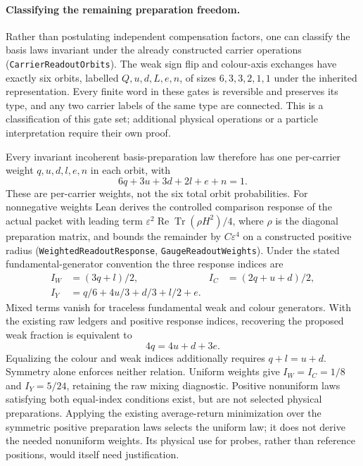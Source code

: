 \paragraph{Classifying the remaining preparation freedom.} Rather than postulating independent compensation factors, one can classify the basis laws invariant under the already constructed carrier operations (\texttt{CarrierReadoutOrbits}). The weak sign flip and colour-axis exchanges have exactly six orbits, labelled $Q,u,d,L,e,n$, of sizes $6,3,3,2,1,1$ under the inherited representation. Every finite word in these gates is reversible and preserves its type, and any two carrier labels of the same type are connected. This is a classification of this gate set; additional physical operations or a particle interpretation require their own proof.

Every invariant incoherent basis-preparation law therefore has one per-carrier weight $q,u,d,l,e,n$ in each orbit, with
\begin{equation}
 6q+3u+3d+2l+e+n=1.
\end{equation}
These are per-carrier weights, not the six total orbit probabilities. For nonnegative weights Lean derives the controlled comparison response of the actual packet with leading term $\varepsilon^2\operatorname{Re}\operatorname{Tr}(\rho H^2)/4$, where $\rho$ is the diagonal preparation matrix, and bounds the remainder by $C\varepsilon^4$ on a constructed positive radius (\texttt{WeightedReadoutResponse}, \texttt{GaugeReadoutWeights}). Under the stated fundamental-generator convention the three response indices are
\begin{align}
 I_W&=(3q+l)/2, & I_C&=(2q+u+d)/2,\\
 I_Y&=q/6+4u/3+d/3+l/2+e.
\end{align}
Mixed terms vanish for traceless fundamental weak and colour generators. With the existing raw ledgers and positive response indices, recovering the proposed weak fraction is equivalent to
\begin{equation}
 4q=4u+d+3e.
\end{equation}
Equalizing the colour and weak indices additionally requires $q+l=u+d$. Symmetry alone enforces neither relation. Uniform weights give $I_W=I_C=1/8$ and $I_Y=5/24$, retaining the raw mixing diagnostic. Positive nonuniform laws satisfying both equal-index conditions exist, but are not selected physical preparations. Applying the existing average-return minimization over the symmetric positive preparation laws selects the uniform law; it does not derive the needed nonuniform weights. Its physical use for probes, rather than reference positions, would itself need justification.

